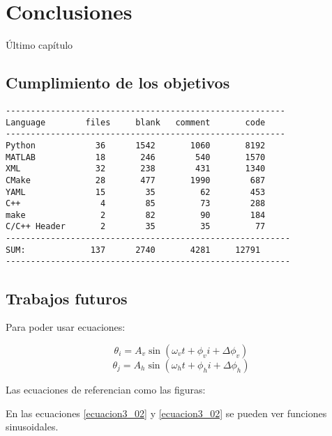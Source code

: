 \chapter{Conclusiones} \label{cap8}

Último capítulo

\newpage

\section{Cumplimiento de los objetivos} \label{s8_1}

\begin{verbatim}
--------------------------------------------------------
Language        files     blank   comment       code
--------------------------------------------------------
Python            36      1542       1060       8192
MATLAB            18       246        540       1570
XML               32       238        431       1340
CMake             28       477       1990        687
YAML              15        35         62        453
C++                4        85         73        288
make               2        82         90        184
C/C++ Header       2        35         35         77
---------------------------------------------------------
SUM:             137      2740       4281     12791
---------------------------------------------------------
\end{verbatim}


\section{Trabajos futuros} \label{s8_3}

	\blindtext
	
	Para poder usar ecuaciones:
	
	\begin{equation} \label{ecuacion3_01}
	\theta_i = A_v\sin(\omega_vt+\phi_vi+\Delta\phi_v)
	\end{equation}
	\begin{equation} \label{ecuacion3_02}
	\theta_j = A_h\sin(\omega_ht+\phi_hi+\Delta\phi_h)
	\end{equation}
	
	Las ecuaciones de referencian  como las figuras: 
	
	En las ecuaciones \ref{ecuacion3_02} y \ref{ecuacion3_02} se pueden ver funciones sinusoidales.
	